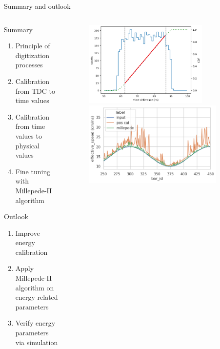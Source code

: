 \documentclass{ikpKoeln}
\begin{document}
\begin{frame}[t]{Summary and outlook}
	\vspace{-2em}
	\begin{columns}[t]
		\begin{column}{0.45 \textwidth}
			\begin{block} {\small Summary}
				\begin{enumerate}
					\setlength\itemsep{0em}
					\item Principle of digitization processes
					\item Calibration from TDC to time values
					\item Calibration from time values to physical values
					\item Fine tuning with Millepede-II algorithm
				\end{enumerate}
			\end{block}
			\begin{exampleblock} {\small Outlook}
				\begin{enumerate}
					\setlength\itemsep{0em}
					\item Improve energy calibration
					\item Apply Millepede-II algorithm on energy-related parameters
					\item Verify energy parameters via simulation
				\end{enumerate}
			\end{exampleblock}
		\end{column}
		\begin{column}{0.45 \textwidth}
			\begin{figure}
				\includegraphics[width = 0.8\textwidth]{neuland/position_cal/TimeDifference4.png}
				\includegraphics[width = 0.9\textwidth]{neuland/millepede/sim_eff_c.png}

\end{figure}
\end{column}
\end{columns}
\end{frame}
\end{document}
